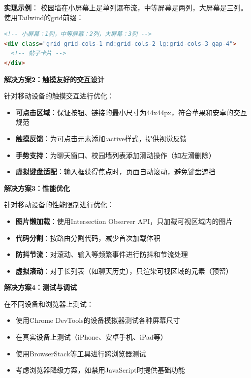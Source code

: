 \documentclass[12pt,a4paper]{article}
\begin{document}
\textbf{实现示例}：
校园墙在小屏幕上是单列瀑布流，中等屏幕是两列，大屏幕是三列。使用Tailwind的grid前缀：
\begin{lstlisting}[language=HTML]
<!-- 小屏幕：1列，中等屏幕：2列，大屏幕：3列 -->
<div class="grid grid-cols-1 md:grid-cols-2 lg:grid-cols-3 gap-4">
  <!-- 帖子卡片 -->
</div>
\end{lstlisting}

\textbf{解决方案2：触摸友好的交互设计}

针对移动设备的触摸交互进行优化：

\begin{itemize}
    \item \textbf{可点击区域}：保证按钮、链接的最小尺寸为44x44px，符合苹果和安卓的交互规范
    \item \textbf{触摸反馈}：为可点击元素添加:active样式，提供视觉反馈
    \item \textbf{手势支持}：为聊天窗口、校园墙列表添加滑动操作（如左滑删除）
    \item \textbf{虚拟键盘适配}：输入框获得焦点时，页面自动滚动，避免键盘遮挡
\end{itemize}

\textbf{解决方案3：性能优化}

针对移动设备的性能限制进行优化：

\begin{itemize}
    \item \textbf{图片懒加载}：使用Intersection Observer API，只加载可视区域内的图片
    \item \textbf{代码分割}：按路由分割代码，减少首次加载体积
    \item \textbf{防抖节流}：对滚动、输入等频繁事件进行防抖和节流处理
    \item \textbf{虚拟滚动}：对于长列表（如聊天历史），只渲染可视区域的元素（预留）
\end{itemize}

\textbf{解决方案4：测试与调试}

在不同设备和浏览器上测试：

\begin{itemize}
    \item 使用Chrome DevTools的设备模拟器测试各种屏幕尺寸
    \item 在真实设备上测试（iPhone、安卓手机、iPad等）
    \item 使用BrowserStack等工具进行跨浏览器测试
    \item 考虑浏览器降级方案，如禁用JavaScript时提供基础功能
\end{itemize}
\end{document}
